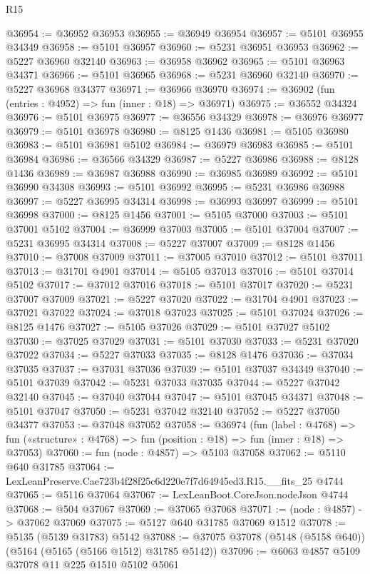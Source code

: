 \begin{lexlean}{R15}
\begin{coremodule}
{{{{{{{{{{{@36954 := @36952 @36953
@36955 := @36949 @36954
@36957 := @5101 @36955 @34349
@36958 := @5101 @36957
@36960 := @5231 @36951 @36953
@36962 := @5227 @36960 @32140
@36963 := @36958 @36962
@36965 := @5101 @36963 @34371
@36966 := @5101 @36965
@36968 := @5231 @36960 @32140
@36970 := @5227 @36968 @34377
@36971 := @36966 @36970
@36974 := @36902 (fun (entries : @4952) => fun (inner : @18) => @36971)
@36975 := @36552 @34324
@36976 := @5101 @36975
@36977 := @36556 @34329
@36978 := @36976 @36977
@36979 := @5101 @36978
@36980 := @8125 @1436
@36981 := @5105 @36980
@36983 := @5101 @36981 @5102
@36984 := @36979 @36983
@36985 := @5101 @36984
@36986 := @36566 @34329
@36987 := @5227 @36986
@36988 := @8128 @1436
@36989 := @36987 @36988
@36990 := @36985 @36989
@36992 := @5101 @36990 @34308
@36993 := @5101 @36992
@36995 := @5231 @36986 @36988
@36997 := @5227 @36995 @34314
@36998 := @36993 @36997
@36999 := @5101 @36998
@37000 := @8125 @1456
@37001 := @5105 @37000
@37003 := @5101 @37001 @5102
@37004 := @36999 @37003
@37005 := @5101 @37004
@37007 := @5231 @36995 @34314
@37008 := @5227 @37007
@37009 := @8128 @1456
@37010 := @37008 @37009
@37011 := @37005 @37010
@37012 := @5101 @37011
@37013 := @31701 @4901
@37014 := @5105 @37013
@37016 := @5101 @37014 @5102
@37017 := @37012 @37016
@37018 := @5101 @37017
@37020 := @5231 @37007 @37009
@37021 := @5227 @37020
@37022 := @31704 @4901
@37023 := @37021 @37022
@37024 := @37018 @37023
@37025 := @5101 @37024
@37026 := @8125 @1476
@37027 := @5105 @37026
@37029 := @5101 @37027 @5102
@37030 := @37025 @37029
@37031 := @5101 @37030
@37033 := @5231 @37020 @37022
@37034 := @5227 @37033
@37035 := @8128 @1476
@37036 := @37034 @37035
@37037 := @37031 @37036
@37039 := @5101 @37037 @34349
@37040 := @5101 @37039
@37042 := @5231 @37033 @37035
@37044 := @5227 @37042 @32140
@37045 := @37040 @37044
@37047 := @5101 @37045 @34371
@37048 := @5101 @37047
@37050 := @5231 @37042 @32140
@37052 := @5227 @37050 @34377
@37053 := @37048 @37052
@37058 := @36974
    (fun (label : @4768) =>
    fun («structure» : @4768) => fun (position : @18) => fun (inner : @18) => @37053)
@37060 := fun (node : @4857) => @5103 @37058
@37062 := @5110 @640 @31785
@37064 := LexLeanPreserve.Cae723b4f28f25c6d220e7f7d64945ed3.R15.__fits_25 @4744
@37065 := @5116 @37064
@37067 := LexLeanBoot.CoreJson.nodeJson @4744
@37068 := @504 @37067
@37069 := @37065 @37068
@37071 := (node : @4857) -> @37062 @37069
@37075 := @5127 @640 @31785 @37069 @1512
@37078 := @5135 (@5139 @31783) @5142
@37088 := @37075 @37078 (@5148 (@5158 @640)) (@5164 (@5165 (@5166 @1512) @31785 @5142))
@37096 := @6063 @4857 @5109 @37078 @11 @225 @1510 @5102 @5061
}}}}}}}}}}}
\end{coremodule}
\end{lexlean}
